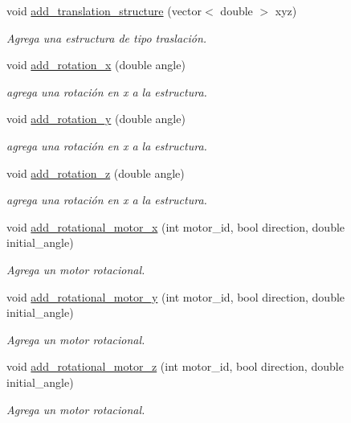\begin{DoxyCompactItemize}
void \hyperlink{class_motion__structure_af1286c27937cdad91bb8ef6ef39e0ff5}{add\-\_\-translation\-\_\-structure} (vector$<$ double $>$ xyz)
\begin{DoxyCompactList}\small\item\em Agrega una estructura de tipo traslación. \end{DoxyCompactList}\item 
void \hyperlink{class_motion__structure_aedd08d7f7fab858ad15f4bc0d265b4d5}{add\-\_\-rotation\-\_\-x} (double angle)
\begin{DoxyCompactList}\small\item\em agrega una rotación en x a la estructura. \end{DoxyCompactList}\item 
void \hyperlink{class_motion__structure_afc92a8d88281379658186f100412e0ae}{add\-\_\-rotation\-\_\-y} (double angle)
\begin{DoxyCompactList}\small\item\em agrega una rotación en x a la estructura. \end{DoxyCompactList}\item 
void \hyperlink{class_motion__structure_ad37ffab28b32f2f88e0a3d556c876318}{add\-\_\-rotation\-\_\-z} (double angle)
\begin{DoxyCompactList}\small\item\em agrega una rotación en x a la estructura. \end{DoxyCompactList}\item 
void \hyperlink{class_motion__structure_ac3d1406488b0806b88d9408c1a9fe12b}{add\-\_\-rotational\-\_\-motor\-\_\-x} (int motor\-\_\-id, bool direction, double initial\-\_\-angle)
\begin{DoxyCompactList}\small\item\em Agrega un motor rotacional. \end{DoxyCompactList}\item 
void \hyperlink{class_motion__structure_a7db25e8dc40c5a5fb8b91869a246b496}{add\-\_\-rotational\-\_\-motor\-\_\-y} (int motor\-\_\-id, bool direction, double initial\-\_\-angle)
\begin{DoxyCompactList}\small\item\em Agrega un motor rotacional. \end{DoxyCompactList}\item 
void \hyperlink{class_motion__structure_af902c8a035766f08b41810fb495050f8}{add\-\_\-rotational\-\_\-motor\-\_\-z} (int motor\-\_\-id, bool direction, double initial\-\_\-angle)
\begin{DoxyCompactList}\small\item\em Agrega un motor rotacional. \end{DoxyCompactList}\item 

\end{DoxyCompactItemize}
